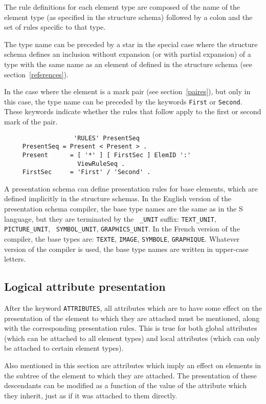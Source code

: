 The rule definitions for each element type are composed of the name of
the element type (as specified in the structure schema) followed by a
colon and the set of rules specific to that type.

The type name can be preceded by a star in the special case where the
structure schema defines an inclusion without expansion (or with
partial expansion) of a type with the same name as an element of
defined in the structure schema (see section~\ref{references}).

In the case where the element is a mark pair (see
section~\ref{paires}), but only in this case, the type name can be
preceded by the keywords {\tt First} or {\tt Second}.  These keywords
indicate whether the rules that follow apply to the first or second
mark of the pair.

\begin{verbatim}
                   'RULES' PresentSeq
     PresentSeq = Present < Present > .
     Present      = [ '*' ] [ FirstSec ] ElemID ':'
                    ViewRuleSeq .
     FirstSec     = 'First' / 'Second' .
\end{verbatim}

A presentation schema can define presentation rules for base elements,
which are defined implicitly in the structure schemas.  In the English
version of the presentation schema compiler, the base type names are
the same as in the S language, but they are terminated by the {\tt
\_UNIT} suffix: {\tt TEXT\_UNIT}, {\tt PICTURE\_UNIT}, {\tt
SYMBOL\_UNIT}, {\tt GRAPHICS\_UNIT}.  In the French version of the
compiler, the base types are: {\tt TEXTE}, {\tt IMAGE}, {\tt SYMBOLE},
{\tt GRAPHIQUE}.  Whatever version of the compiler is used, the base
type names are written in upper-case letters.

\subsection{Logical attribute presentation}
\label{presattributes}

After the keyword {\tt ATTRIBUTES}, all attributes which are to have
some effect on the presentation of the element to which they are
attached must be mentioned, along with the corresponding presentation
rules.  This is true for both global attributes (which can be attached
to all element types) and local attributes (which can only be attached
to certain element types).

Also mentioned in this section are attributes which imply an effect on
elements in the subtree of the element to which they are attached.
The presentation of these descendants  can be modified as a function
of the value of the attribute which they inherit, just as if it was
attached to them directly.

